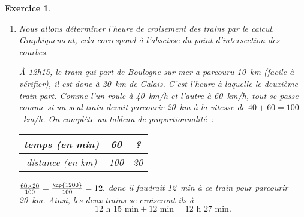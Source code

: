 \documentclass[10pt]{article}
\newtheorem{exo}{Exercice}
\begin{document}
\begin{exo}
\begin{enumerate}
\item Nous allons déterminer l'heure de croisement des trains par le calcul. Graphiquement, cela correspond à l'abscisse du point d'intersection des courbes.

\medskip

\`A 12h15, le train qui part de Boulogne-sur-mer a parcouru 10~km (facile à vérifier), il est donc à 20~km de Calais. C'est l'heure à laquelle le deuxième train part. Comme l'un roule à 40~km/h et l'autre à 60~km/h, tout se passe comme si un seul train devait parcourir 20~km à la vitesse de $40+60=100$~km/h. On complète un tableau de proportionnalité~:

\begin{center}
\begin{tabular}{|c|c|c|}\hline
temps (en min)& 60&? \\ \hline 
distance (en km)&100& 20 \\ \hline
\end{tabular}
\end{center}

$\frac{60\times 20}{100}=\frac{\np{1200}}{100}=12,$ donc il faudrait 12~min à ce train pour parcourir 20~km. Ainsi, les deux trains se croiseront-ils à \[\text{12 h 15 min}+\text{12 min}=\text{12 h 27 min}.\]
 
\end{enumerate}

\end{exo}
\end{document}
